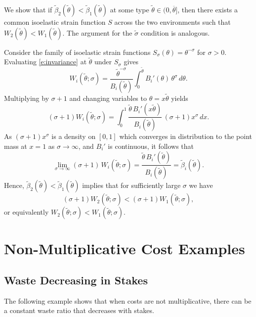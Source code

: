 \documentclass[12 pt]{article}
\makeatletter
\newenvironment{proof}[1][Proof]{\noindent\textbf{#1} }{\ \rule{0.5em}{0.5em}}
\theoremstyle{remark}
\theoremstyle{definition}
\def\typemin{0}
\def\typemax{\overline \theta}
\newcommand{\elaB}{\tilde\beta}   %
\newcommand{\elaS}{\tilde\sigma}  %
\renewenvironment{proof}[1][\proofname] {\par\pushQED{\qed}\normalfont\topsep6\p@\@plus6\p@\relax\trivlist\item[\hskip\labelsep\bfseries#1\@addpunct{.}]\ignorespaces}{\popQED\endtrivlist\@endpefalse}
\makeatother
\begin{document}
\begin{proof}[Proof of tightness of the conditions in \autoref{prop:comp_stat}]
We show that if $\elaB_2(\tilde\theta)<\elaB_1(\tilde\theta)$ at some type $\tilde\theta\in(\typemin,\typemax]$, then there exists a common isoelastic strain function $S$ across the two environments such that $W_2(\tilde\theta)<W_1(\tilde\theta)$. The argument for the $\elaS$ condition is analogous.

Consider the family of isoelastic strain functions $S_\sigma(\theta)=\theta^{-\sigma}$ for $\sigma>0$. Evaluating \autoref{e:invariance} at $\tilde\theta$ under $S_\sigma$ gives
\[
W_i(\tilde\theta;\sigma)
=
\frac{\tilde\theta^{-\sigma}}{B_i(\tilde\theta)}
\int_{\typemin}^{\tilde\theta} B_i'(
\theta)\,\theta^\sigma\,d\theta.
\]
Multiplying by $\sigma+1$ and changing variables to $\theta=x\tilde\theta$ yields
\[
(\sigma+1)W_i(\tilde\theta;\sigma)
=
\int_0^1 \frac{\tilde\theta\, B_i'(x\tilde\theta)}{B_i(\tilde\theta)}\,(\sigma+1)x^\sigma\,dx.
\]
As $(\sigma+1)x^\sigma$ is a density on $[0,1]$ which converges in distribution to the point mass at $x=1$ as $\sigma\to\infty$, and $B_i'$ is continuous, it follows that
\[
\lim_{\sigma\to\infty}(\sigma+1)\,W_i(\tilde\theta;\sigma)
=
\frac{\tilde\theta\, B_i'(\tilde\theta)}{B_i(\tilde\theta)}
=
\elaB_i(\tilde\theta).
\]
Hence, $\elaB_2(\tilde\theta)<\elaB_1(\tilde\theta)$ implies that for sufficiently large $\sigma$ we have $$(\sigma+1)W_2(\tilde\theta;\sigma)<(\sigma+1)W_1(\tilde\theta;\sigma),$$ or equivalently $W_2(\tilde\theta;\sigma)<W_1(\tilde\theta;\sigma)$.
\end{proof}

\section{Non-Multiplicative Cost Examples}
\label{sec:countereg}

\subsection{Waste Decreasing in Stakes}
\label{subsec:waste_decreasing_in_s}

The following example shows that when costs are not multiplicative, there can be a constant waste ratio that decreases with stakes.
\end{document}
